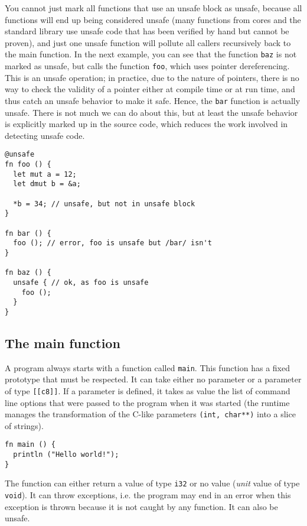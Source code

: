 You cannot just mark all functions that use an unsafe block as unsafe, because
all functions will end up being considered unsafe (many functions from cores and
the standard library use unsafe code that has been verified by hand but cannot
be proven), and just one unsafe function will pollute all callers recursively
back to the main function. In the next example, you can see that the function
\texttt{baz} is not marked as unsafe, but calls the function \texttt{foo}, which
uses pointer dereferencing. This is an unsafe operation; in practice, due to the
nature of pointers, there is no way to check the validity of a pointer either at
compile time or at run time, and thus catch an unsafe behavior to make it safe.
Hence, the \texttt{bar} function is actually unsafe. There is not much we can do
about this, but at least the unsafe behavior is explicitly marked up in the
source code, which reduces the work involved in detecting unsafe code.

\begin{lstlisting}[style=coloredverbatim]
@unsafe
fn foo () {
  let mut a = 12;
  let dmut b = &a;

  *b = 34; // unsafe, but not in unsafe block
}

fn bar () {
  foo (); // error, foo is unsafe but /bar/ isn't
}

fn baz () {
  unsafe { // ok, as foo is unsafe
    foo ();
  }
}
\end{lstlisting}

\subsection{The main function}

A program always starts with a function called \texttt{main}. This function has
a fixed prototype that must be respected. It can take either no parameter or a
parameter of type \texttt{[[c8]]}. If a parameter is defined, it takes as value
the list of command line options that were passed to the program when it was
started (the runtime manages the transformation of the C-like parameters
\texttt{(int, char**)} into a slice of strings).

\begin{lstlisting}[style=coloredverbatim, caption=The simplest main function]
fn main () {
  println ("Hello world!");
}
\end{lstlisting}

The function can either return a value of type \texttt{i32} or no value
(\textit{unit} value of type \texttt{void}). It can throw exceptions, i.e. the
program may end in an error when this exception is thrown because it is not
caught by any function. It can also be unsafe.


